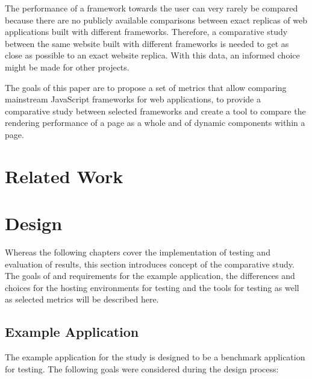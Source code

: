 \documentclass[a4paper, fontsize=11pt]{article}
\begin{document}
The performance of a framework towards the user can very rarely be compared because there are no publicly available comparisons between exact replicas of web applications built with different frameworks.
Therefore, a comparative study between the same website built with different frameworks is needed to get as close as possible to an exact website replica.
With this data, an informed choice might be made for other projects.

The goals of this paper are to propose a set of metrics that allow comparing mainstream JavaScript frameworks for web applications, to provide a comparative study between selected frameworks and create a tool to compare the rendering performance of a page as a whole and of dynamic components within a page.

\section{Related Work}\label{sec:relatedwork}
\section{Design}\label{sec:design}

Whereas the following chapters cover the implementation of testing and evaluation of results, this section introduces concept of the comparative study.
The goals of and requirements for the example application, the differences and choices for the hosting environments for testing and the tools for testing as well as selected metrics will be described here.

\subsection{Example Application}\label{subsec:exampleapplication}
%
% 

The example application for the study is designed to be a benchmark application for testing.
The following goals were considered during the design process:
\end{document}
